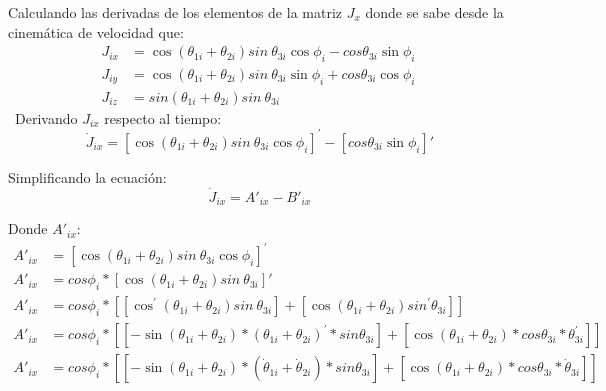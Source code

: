             Calculando las derivadas de los elementos de la matriz  $J_{x}$ donde se sabe desde la cinemática de velocidad que:
            \begin{align*}
              J_{ix}&=\cos  \left(  \theta _{1i}+ \theta _{2i} \right) sin~ \theta _{3i}\cos  \phi _{i}-cos  \theta _{3i}\sin  \phi _{i}~  \\
              J_{iy}&=\cos  \left(  \theta _{1i}+ \theta _{2i} \right) sin~ \theta _{3i}\sin  \phi _{i}+ cos  \theta _{3i}\cos  \phi _{i}~  \\
              J_{iz}&=sin \left(  \theta _{1i}+ \theta _{2i} \right) sin~ \theta _{3i}~  
            \end{align*}\
            Derivando $J_{ix}$ respecto al tiempo:
            \begin{equation*}
                 \dot{J}_{ix}= \left[ \cos  \left(  \theta _{1i}+ \theta _{2i} \right) sin~ \theta _{3i}\cos  \phi _{i} \right] ^{'}- \left[ cos  \theta _{3i}\sin  \phi _{i} \right] ' 
            \end{equation*}
            
            Simplificando la ecuación:
            \begin{equation}
                \dot{J}_{ix}=A'_{ix}-B'_{ix}
            \end{equation}
            
                        \newpage


            Donde   $A'_{ix}$:
            \begin{align*}
                 A'_{ix}&=  \left[ \cos  \left(  \theta _{1i}+ \theta _{2i} \right) sin~ \theta _{3i}\cos  \phi _{i} \right] ^{'} \\
                 A'_{ix}&= cos \phi _{i}\ast \left[ \cos  \left(  \theta _{1i}+ \theta _{2i} \right) sin~ \theta _{3i} \right] '  \\
                 A'_{ix}&= cos \phi _{i}\ast \left[  \left[ \cos ^{'} \left(  \theta _{1i}+ \theta _{2i} \right) sin~ \theta _{3i} \right] + \left[ \cos  \left(  \theta _{1i}+ \theta _{2i} \right) sin^{'} \theta _{3i} \right]  \right]  \\
                 A'_{ix}&= cos \phi _{i}\ast \left[  \left[ -\sin  \left(  \theta _{1i}+ \theta _{2i} \right) \ast \left(  \theta _{1i}+ \theta _{2i} \right) ^{'}\ast sin  \theta _{3i} \right]  + \left[ \cos  \left(  \theta _{1i}+ \theta _{2i} \right) \ast cos  \theta _{3i}\ast \theta ^{'}_{3i} \right]  \right]  \\
                 A'_{ix}&= cos \phi _{i}\ast \left[  \left[ -\sin  \left(  \theta _{1i}+ \theta _{2i} \right) \ast \left( \dot{ \theta }_{1i}+\dot{ \theta }_{2i} \right) \ast sin  \theta _{3i} \right]  + \left[ \cos  \left(  \theta _{1i}+ \theta _{2i} \right) \ast cos  \theta _{3i}\ast\dot{ \theta }_{3i} \right]  \right] 
            \end{align*}
            
